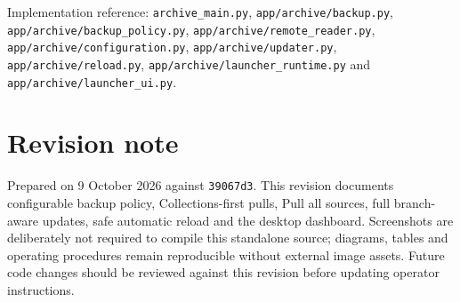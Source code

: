 \documentclass[11pt,oneside,openany]{book}
\newcommand{\pathcode}[1]{\nolinkurl{#1}}
\newcommand{\commitid}{\texttt{39067d3}}
\newcommand{\documentdate}{9 October 2026}
\begin{document}
Implementation reference: \pathcode{archive_main.py},
\pathcode{app/archive/backup.py}, \pathcode{app/archive/backup_policy.py},
\pathcode{app/archive/remote_reader.py}, \pathcode{app/archive/configuration.py},
\pathcode{app/archive/updater.py}, \pathcode{app/archive/reload.py},
\pathcode{app/archive/launcher_runtime.py} and \pathcode{app/archive/launcher_ui.py}.

\backmatter
\chapter*{Revision note}
Prepared on \documentdate{} against \commitid{}. This revision documents configurable
backup policy, Collections-first pulls, Pull all sources, full branch-aware updates,
safe automatic reload and the desktop dashboard. Screenshots are deliberately not
required to compile this standalone source; diagrams, tables and operating procedures
remain reproducible without external image assets. Future code changes should be
reviewed against this revision before updating operator instructions.
\end{document}
